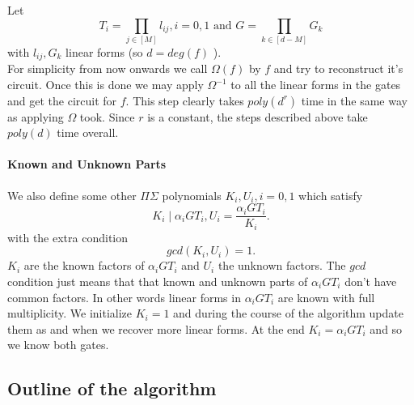 \documentclass[letterpaper,USenglish,numberwithinsect]{lipics}
\begin{document}
Let
\[
T_i = \prod\limits_{j\in [M]} l_{ij}, i=0,1 \text{ and } G = \prod\limits_{k\in[d-M]}G_k
\]
with $l_{ij},G_k$ linear forms (so $d = deg(f)$ ).\\

For simplicity from now onwards we call $\Omega(f)$ by $f$ and try to reconstruct it's circuit. Once this is done we may apply $\Omega^{-1}$ to
all the linear forms in the gates and get the circuit for $f$. This step clearly takes $poly(d^r)$ time in the same way as applying $\Omega$ took.
Since $r$ is a constant, the steps described above take $poly(d)$ time overall.


\paragraph{Known and Unknown Parts}
We also define some other $\Pi\Sigma$ polynomials $K_i,U_i, i=0,1$
which satisfy
\[
K_i\mid \alpha_iGT_i, U_i=\frac{\alpha_iGT_i}{K_i}.
\]
with the extra condition
\[
gcd(K_i,U_i)=1.
\]
$K_i$ are the known factors of $\alpha_iGT_i$ and $U_i$ the unknown factors. The
$gcd$ condition just means
that that known and unknown parts of $\alpha_iGT_i$ don't have common factors.
In other words linear forms in $\alpha_iGT_i$ are known with full multiplicity.
We initialize $K_i=1$ and during the course of the algorithm update them as and
when we recover more linear forms.
At the end $K_i=\alpha_iGT_i$ and so we know both gates.


\subsection{Outline of the algorithm}
\end{document}
